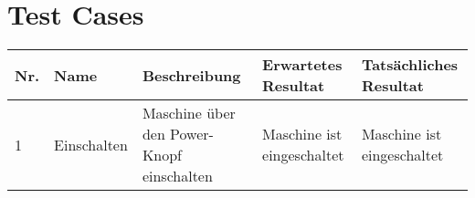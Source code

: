 \chapter{Test Cases}\label{ch:test-cases}

\begin{longtable}{|p{}|p{}|p{}|p{}|p{}|}
    \hline
    \textbf{Nr.} & \textbf{Name} & \textbf{Beschreibung} & \textbf{Erwartetes Resultat} & \textbf{Tatsächliches Resultat}
    \\ \hline
    1 & Einschalten & Maschine über den Power-Knopf einschalten & Maschine ist eingeschaltet
    & Maschine ist eingeschaltet
    \\ \hline
\end{longtable}\label{tab:test-cases}

